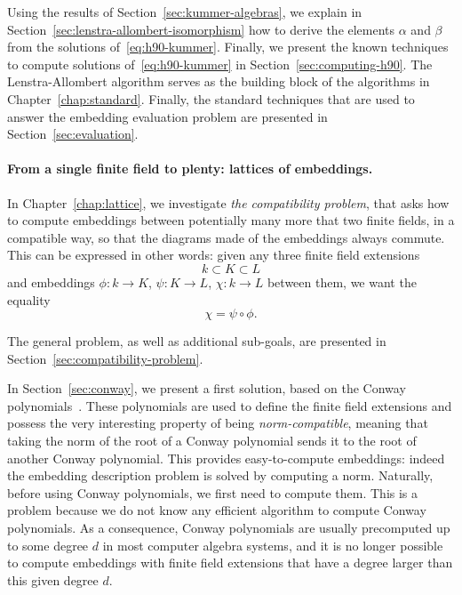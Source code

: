 Using the results of Section~\ref{sec:kummer-algebras}, we explain in
Section~\ref{sec:lenstra-allombert-isomorphism} how to derive the elements
$\alpha$ and $\beta$ from the solutions of~\eqref{eq:h90-kummer}. Finally, we
present the known techniques to compute solutions of~\eqref{eq:h90-kummer} in
Section~\ref{sec:computing-h90}. The Lenstra-Allombert algorithm serves as the
building block of the algorithms in Chapter~\ref{chap:standard}. Finally, the
standard techniques that are used to answer the embedding evaluation problem are
presented in Section~\ref{sec:evaluation}.

\paragraph{From a single finite field to plenty: lattices of embeddings.}
In Chapter~\ref{chap:lattice}, we investigate \emph{the compatibility problem},
that asks how to compute embeddings between potentially many more that two
finite fields, in a compatible way, \ie so that the diagrams made of the embeddings
always commute. This can be expressed in other words: given any three finite
field extensions 
\[
  k \subset K\subset L
\]
and embeddings $\phi:k\to K$, $\psi:K\to L$, $\chi:k\to L$ between them, we want
the equality
\[
  \chi=\psi\circ\phi.
\]
\begin{center}
\end{center}
The general problem, as well as additional sub-goals, are presented in
Section~\ref{sec:compatibility-problem}.

In Section~\ref{sec:conway}, we present a first solution, based on the Conway
polynomials~\cite{Parker90, Scheerhorn92}. These polynomials are used to define
the finite field extensions and possess the very interesting property of being
\emph{norm-compatible}, meaning that taking the norm of the root of a Conway
polynomial sends it to the root of another Conway polynomial. This provides
easy-to-compute embeddings: indeed the embedding description problem is solved
by computing a norm. Naturally, before using Conway polynomials, we first need
to compute them. This is a problem because we do not know any efficient
algorithm to compute Conway polynomials. As a consequence, Conway polynomials
are usually precomputed up to some degree $d$ in most computer algebra systems,
and it is no longer possible to compute embeddings with finite field extensions
that have a degree larger than this given degree $d$.


